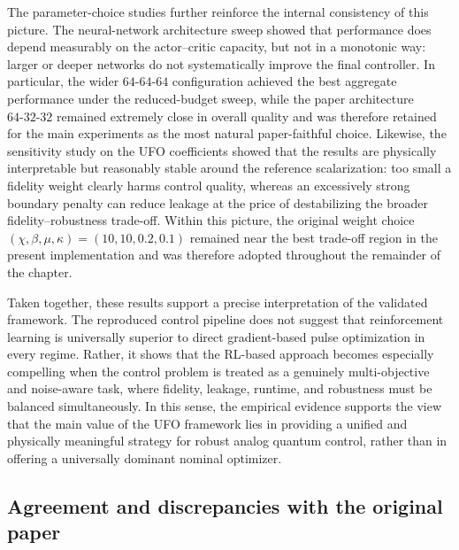 The parameter-choice studies further reinforce the internal consistency of this picture. The neural-network architecture sweep showed that performance does depend measurably on the actor--critic capacity, but not in a monotonic way: larger or deeper networks do not systematically improve the final controller. In particular, the wider \(64\text{-}64\text{-}64\) configuration achieved the best aggregate performance under the reduced-budget sweep, while the paper architecture \(64\text{-}32\text{-}32\) remained extremely close in overall quality and was therefore retained for the main experiments as the most natural paper-faithful choice. Likewise, the sensitivity study on the UFO coefficients showed that the results are physically interpretable but reasonably stable around the reference scalarization: too small a fidelity weight clearly harms control quality, whereas an excessively strong boundary penalty can reduce leakage at the price of destabilizing the broader fidelity--robustness trade-off. Within this picture, the original weight choice \((\chi,\beta,\mu,\kappa)=(10,10,0.2,0.1)\) remained near the best trade-off region in the present implementation and was therefore adopted throughout the remainder of the chapter.

Taken together, these results support a precise interpretation of the validated framework. The reproduced control pipeline does not suggest that reinforcement learning is universally superior to direct gradient-based pulse optimization in every regime. Rather, it shows that the RL-based approach becomes especially compelling when the control problem is treated as a genuinely multi-objective and noise-aware task, where fidelity, leakage, runtime, and robustness must be balanced simultaneously. In this sense, the empirical evidence supports the view that the main value of the UFO framework lies in providing a unified and physically meaningful strategy for robust analog quantum control, rather than in offering a universally dominant nominal optimizer.



\subsection{Agreement and discrepancies with the original paper}
\label{subsec:agreement_discrepancies_original_paper}

